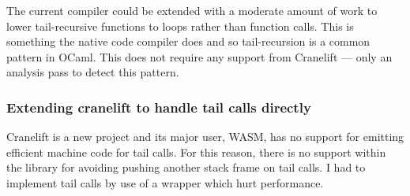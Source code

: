 The current compiler could be extended with a moderate amount of work to lower tail-recursive
functions to loops rather than function calls. This is something the native code compiler does and
so tail-recursion is a common pattern in OCaml. This does not require any support from Cranelift
--- only an analysis pass to detect this pattern.

\subsubsection{Extending cranelift to handle tail calls directly}

Cranelift is a new project and its major user, WASM, has no support for emitting efficient machine
code for tail calls.  For this reason, there is no support within the library for avoiding pushing
another stack frame on tail calls. I had to implement tail calls by use of a wrapper which hurt
performance.
